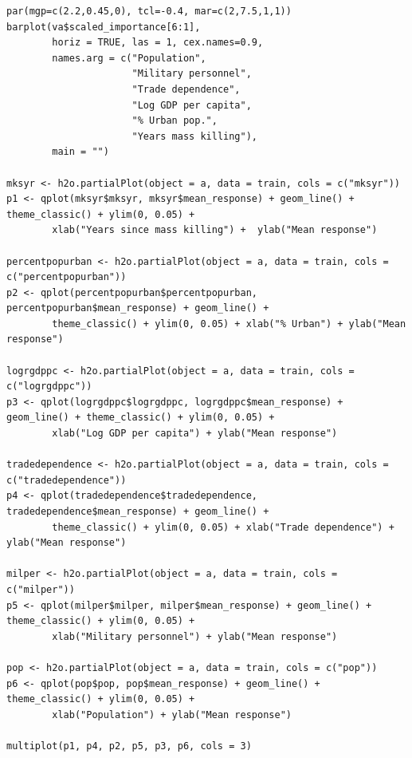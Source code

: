 \begin{verbatim}
par(mgp=c(2.2,0.45,0), tcl=-0.4, mar=c(2,7.5,1,1))
barplot(va$scaled_importance[6:1],
        horiz = TRUE, las = 1, cex.names=0.9,
        names.arg = c("Population", 
                      "Military personnel",
                      "Trade dependence", 
                      "Log GDP per capita",
                      "% Urban pop.",
                      "Years mass killing"),
        main = "")

mksyr <- h2o.partialPlot(object = a, data = train, cols = c("mksyr"))
p1 <- qplot(mksyr$mksyr, mksyr$mean_response) + geom_line() + theme_classic() + ylim(0, 0.05) +
        xlab("Years since mass killing") +  ylab("Mean response")
        
percentpopurban <- h2o.partialPlot(object = a, data = train, cols = c("percentpopurban"))
p2 <- qplot(percentpopurban$percentpopurban, percentpopurban$mean_response) + geom_line() +
        theme_classic() + ylim(0, 0.05) + xlab("% Urban") + ylab("Mean response")

logrgdppc <- h2o.partialPlot(object = a, data = train, cols = c("logrgdppc"))
p3 <- qplot(logrgdppc$logrgdppc, logrgdppc$mean_response) + geom_line() + theme_classic() + ylim(0, 0.05) +
        xlab("Log GDP per capita") + ylab("Mean response")

tradedependence <- h2o.partialPlot(object = a, data = train, cols = c("tradedependence"))
p4 <- qplot(tradedependence$tradedependence, tradedependence$mean_response) + geom_line() +
        theme_classic() + ylim(0, 0.05) + xlab("Trade dependence") + ylab("Mean response")

milper <- h2o.partialPlot(object = a, data = train, cols = c("milper"))
p5 <- qplot(milper$milper, milper$mean_response) + geom_line() + theme_classic() + ylim(0, 0.05) +
        xlab("Military personnel") + ylab("Mean response")

pop <- h2o.partialPlot(object = a, data = train, cols = c("pop"))
p6 <- qplot(pop$pop, pop$mean_response) + geom_line() + theme_classic() + ylim(0, 0.05) +
        xlab("Population") + ylab("Mean response")

multiplot(p1, p4, p2, p5, p3, p6, cols = 3)



\end{verbatim}
